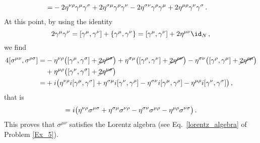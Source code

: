 \begin{sol}
\begin{equation}
\begin{split}
        = & - 2\eta^{\nu\rho} \gamma^\mu \gamma^\sigma + 2\eta^{\sigma\mu} \gamma^\rho \gamma^\nu - 2\eta^{\sigma\nu} \gamma^\rho \gamma^\mu + 2\eta^{\mu\rho} \gamma^\nu \gamma^\sigma \, . 
    \end{split}
    \end{equation}
    At this point, by using the identity 
    \begin{equation}
        2 \gamma^\mu \gamma^\nu = [\gamma^\mu, \gamma^\nu] + \{\gamma^\mu, \gamma^\nu\} = [\gamma^\mu, \gamma^\nu] + 2\g^{\mu \nu} \id_N \, , 
    \end{equation}
    we find
    \begin{equation}
    \begin{split}
        4 [\sigma^{\mu\nu} , \sigma^{\rho\sigma}] = & - \eta^{\nu\rho} \big([\gamma^\mu, \gamma^\sigma] + \cancel{2\eta^{\mu\sigma}}\big) + \eta^{\sigma\mu} \big([\gamma^\rho, \gamma^\nu] + \cancel{2\eta^{\rho\nu}}\big) - \eta^{\sigma\nu} \big([\gamma^\rho, \gamma^\mu] + \cancel{2\eta^{\rho\mu}}\big) \\
        & + \eta^{\mu\rho} \big([\gamma^\nu, \gamma^\sigma] + \cancel{2\eta^{\nu\sigma}}\big) \\
        = & + i \big(\eta^{\nu\rho} i[\gamma^\mu, \gamma^\sigma] + \eta^{\sigma\mu} i[\gamma^\nu, \gamma^\rho] - \eta^{\sigma\nu} i[\gamma^\mu, \gamma^\rho] - \eta^{\mu\rho} i[\gamma^\nu, \gamma^\sigma]\big) \, ,
    \end{split}
    \end{equation}
    that is
    \begin{equation}
        [\sigma^{\mu\nu} , \sigma^{\rho\sigma}] = i \big(\g^{\nu\rho} \sigma^{\mu\sigma} + \g^{\sigma\mu} \sigma^{\nu\rho} - \g^{\sigma\nu} \sigma^{\mu\rho} - \g^{\mu\rho} \sigma^{\nu\sigma}\big) \, .
    \end{equation}
    This proves that $\sigma^{\mu\nu}$ satisfies the Lorentz algebra (see Eq.~\eqref{lorentz_algebra} of Problem \ref{Ex_5}). 
\end{sol}